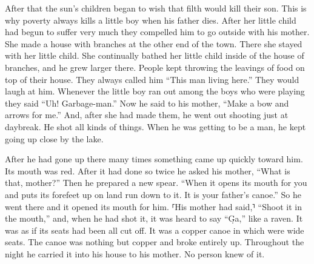 After that the sun’s children began to wish that filth would kill their son.
This is why poverty always kills a little boy when his father dies.
After her little child had begun to suffer very much they compelled him to go outside with his mother.
She made a house with branches at the other end of the town.
There she stayed with her little child.
She continually bathed her little child inside of the house of branches,
and he grew larger there.
People kept throwing the leavings of food on top of their house.
They always called him “This man living here.”
They would laugh at him.
Whenever the little boy ran out among the boys who were playing
they said “Uh! Garbage-man.”
Now he said to his mother, “Make a bow and arrows for me.”
And, after she had made them, he went out shooting just at daybreak.
He shot all kinds of things.
When he was getting to be a man, he kept going up close by the lake.

After he had gone up there many times something came up quickly toward him.
Its mouth was red.
After it had done so twice he asked his mother,
\qqk{}“What is that, mother?”
Then he prepared a new spear.
\qqk{}“When it opens its mouth for you
and puts its forefeet up on land
run down to it.
It is your father’s canoe.”
So he went there and it opened its mouth for him. ⸢His mother had said,⸣ “Shoot it in the mouth,” and,
when he had shot it, it was heard to say “G̣a,” like a raven.
It was as if its seats had been all cut off.
It was a copper canoe
in which were wide seats.
The canoe was nothing but copper
and broke entirely up.
Throughout the night he carried it into his house to his mother.
No person knew of it.

